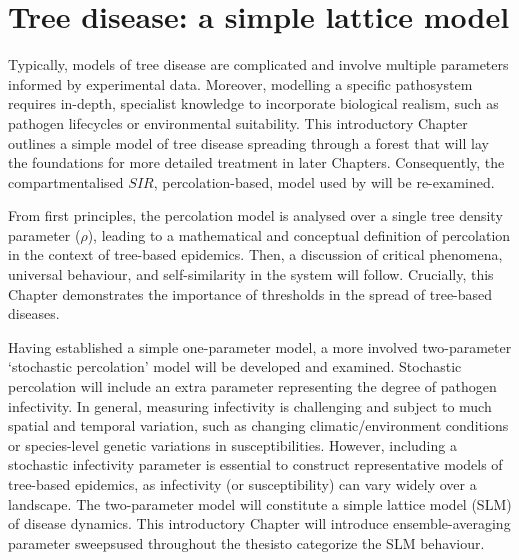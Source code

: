
\chapter{Tree disease: a simple lattice model}
\label{chapter:SLM}

Typically, models of tree disease are complicated and involve multiple parameters informed by experimental data. Moreover, modelling a specific pathosystem requires in-depth, specialist knowledge to incorporate biological realism, such as pathogen lifecycles or environmental suitability. This introductory Chapter outlines a simple model of tree disease spreading through a forest that will lay the foundations for more detailed treatment in later Chapters.
Consequently, the compartmentalised $SIR$, percolation-based, model used by \cite{OROZCOFUENTES201912} will be re-examined. 

From first principles, the percolation model is analysed over a single tree density parameter ($\rho$), leading to a mathematical and conceptual definition of percolation in the context of tree-based epidemics. 
Then, a discussion of critical phenomena, universal behaviour, and self-similarity in the system will follow. Crucially, this Chapter demonstrates the importance of thresholds in the spread of tree-based diseases.

Having established a simple one-parameter model, a more involved two-parameter `stochastic percolation' model will be developed and examined. 
Stochastic percolation will include an extra parameter representing the degree of pathogen infectivity. 
In general, measuring infectivity is challenging and subject to much spatial and temporal variation, such as changing climatic/environment conditions or species-level genetic variations in susceptibilities.  
However, including a stochastic infectivity parameter is essential to construct representative models of tree-based epidemics, as infectivity (or susceptibility) can vary widely over a landscape.
The two-parameter model will constitute a simple lattice model (SLM) of disease dynamics. 
This introductory Chapter will introduce ensemble-averaging parameter sweeps\textemdash used throughout the thesis\textemdash to categorize the SLM behaviour.

